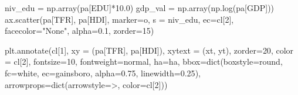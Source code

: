 \documentclass[
  letterpaper,
  DIV=11,
  numbers=noendperiod]{scrreprt}
\newenvironment{Shaded}{\begin{snugshade}}{\end{snugshade}}
\newcommand{\BuiltInTok}[1]{\textcolor[rgb]{0.00,0.23,0.31}{#1}}
\newcommand{\DecValTok}[1]{\textcolor[rgb]{0.68,0.00,0.00}{#1}}
\newcommand{\FloatTok}[1]{\textcolor[rgb]{0.68,0.00,0.00}{#1}}
\newcommand{\NormalTok}[1]{\textcolor[rgb]{0.00,0.23,0.31}{#1}}
\newcommand{\OperatorTok}[1]{\textcolor[rgb]{0.37,0.37,0.37}{#1}}
\newcommand{\StringTok}[1]{\textcolor[rgb]{0.13,0.47,0.30}{#1}}
\begin{document}
\begin{Shaded}
\begin{Highlighting}[]
\NormalTok{    niv\_edu }\OperatorTok{=}\NormalTok{ np.array(pa[}\StringTok{\textquotesingle{}EDU\textquotesingle{}}\NormalTok{]}\OperatorTok{*}\FloatTok{10.0}\NormalTok{)}
\NormalTok{    gdp\_val }\OperatorTok{=}\NormalTok{ np.array(np.log(pa[}\StringTok{\textquotesingle{}GDP\textquotesingle{}}\NormalTok{]))}
\NormalTok{    ax.scatter(pa[}\StringTok{\textquotesingle{}TFR\textquotesingle{}}\NormalTok{], pa[}\StringTok{\textquotesingle{}HDI\textquotesingle{}}\NormalTok{], marker}\OperatorTok{=}\StringTok{\textquotesingle{}o\textquotesingle{}}\NormalTok{, s }\OperatorTok{=}\NormalTok{ niv\_edu, ec}\OperatorTok{=}\NormalTok{cl[}\DecValTok{2}\NormalTok{], facecolor}\OperatorTok{=}\StringTok{"None"}\NormalTok{, alpha}\OperatorTok{=}\FloatTok{0.1}\NormalTok{, zorder}\OperatorTok{=}\DecValTok{15}\NormalTok{)}

\NormalTok{    plt.annotate(cl[}\DecValTok{1}\NormalTok{], xy }\OperatorTok{=}\NormalTok{ (pa[}\StringTok{\textquotesingle{}TFR\textquotesingle{}}\NormalTok{], pa[}\StringTok{\textquotesingle{}HDI\textquotesingle{}}\NormalTok{]), xytext }\OperatorTok{=}\NormalTok{ (xt, yt), zorder}\OperatorTok{=}\DecValTok{20}\NormalTok{,}
\NormalTok{                     color }\OperatorTok{=}\NormalTok{ cl[}\DecValTok{2}\NormalTok{], fontsize}\OperatorTok{=}\DecValTok{10}\NormalTok{, fontweight}\OperatorTok{=}\StringTok{\textquotesingle{}normal\textquotesingle{}}\NormalTok{, ha}\OperatorTok{=}\NormalTok{ha,}
\NormalTok{                     bbox}\OperatorTok{=}\BuiltInTok{dict}\NormalTok{(boxstyle}\OperatorTok{=}\StringTok{\textquotesingle{}round\textquotesingle{}}\NormalTok{, fc}\OperatorTok{=}\StringTok{\textquotesingle{}white\textquotesingle{}}\NormalTok{, ec}\OperatorTok{=}\StringTok{\textquotesingle{}gainsboro\textquotesingle{}}\NormalTok{, alpha}\OperatorTok{=}\FloatTok{0.75}\NormalTok{, linewidth}\OperatorTok{=}\FloatTok{0.25}\NormalTok{),}
\NormalTok{                     arrowprops}\OperatorTok{=}\BuiltInTok{dict}\NormalTok{(arrowstyle}\OperatorTok{=}\StringTok{\textquotesingle{}{-}\textgreater{}\textquotesingle{}}\NormalTok{, color}\OperatorTok{=}\NormalTok{cl[}\DecValTok{2}\NormalTok{]))}
    

\end{Highlighting}
\end{Shaded}
\end{document}
